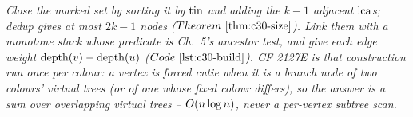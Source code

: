 \begin{recallbox}
\emph{Close the marked set by sorting it by \(\operatorname{tin}\) and adding the \(k-1\) adjacent
\(\operatorname{lca}\)s; dedup gives at most \(2k-1\) nodes (\(\thmref{c30-size}\)).  Link them with a
monotone stack whose predicate is Ch.~5's ancestor test, and give each edge weight
\(\operatorname{depth}(v)-\operatorname{depth}(u)\) (\(\coderef{c30-build}\)).  CF 2127E is that construction
run once per colour: a vertex is forced cutie when it is a branch node of two colours'
virtual trees (or of one whose fixed colour differs), so the answer is a sum over
\emph{overlapping} virtual trees -- \(O(n\log n)\), never a per-vertex subtree scan.}
\end{recallbox}
